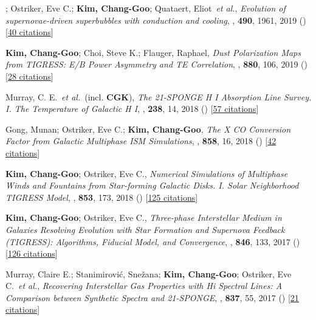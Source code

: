 \item[{18.}]; Ostriker, Eve C.; \textbf{Kim, Chang-Goo}; Quataert, Eliot~\textit{et al.}, \textit{Evolution of supernovae-driven superbubbles with conduction and cooling}, , \textbf{490}, 1961, 2019 () [\href{http://adsabs.harvard.edu/abs/2019MNRAS.490.1961E}{40 citations}]

\item[{17.}]\textbf{Kim, Chang-Goo}; Choi, Steve K.; Flauger, Raphael, \textit{Dust Polarization Maps from TIGRESS: E/B Power Asymmetry and TE Correlation}, , \textbf{880}, 106, 2019 () [\href{http://adsabs.harvard.edu/abs/2019ApJ...880..106K}{28 citations}]

\item[{16.}]Murray, C. E.~\textit{et al.}~(incl. \textbf{CGK}), \textit{The 21-SPONGE H I Absorption Line Survey. I. The Temperature of Galactic H I}, , \textbf{238}, 14, 2018 () [\href{http://adsabs.harvard.edu/abs/2018ApJS..238...14M}{57 citations}]

\item[{15.}]Gong, Munan; Ostriker, Eve C.; \textbf{Kim, Chang-Goo}, \textit{The X CO Conversion Factor from Galactic Multiphase ISM Simulations}, , \textbf{858}, 16, 2018 () [\href{http://adsabs.harvard.edu/abs/2018ApJ...858...16G}{42 citations}]

\item[{14.}]\textbf{Kim, Chang-Goo}; Ostriker, Eve C., \textit{Numerical Simulations of Multiphase Winds and Fountains from Star-forming Galactic Disks. I. Solar Neighborhood TIGRESS Model}, , \textbf{853}, 173, 2018 () [\href{http://adsabs.harvard.edu/abs/2018ApJ...853..173K}{125 citations}]

\item[{13.}]\textbf{Kim, Chang-Goo}; Ostriker, Eve C., \textit{Three-phase Interstellar Medium in Galaxies Resolving Evolution with Star Formation and Supernova Feedback (TIGRESS): Algorithms, Fiducial Model, and Convergence}, , \textbf{846}, 133, 2017 () [\href{http://adsabs.harvard.edu/abs/2017ApJ...846..133K}{126 citations}]

\item[{12.}]Murray, Claire E.; Stanimirovi{\'c}, Sne{\v{z}}ana; \textbf{Kim, Chang-Goo}; Ostriker, Eve C.~\textit{et al.}, \textit{Recovering Interstellar Gas Properties with Hi Spectral Lines: A Comparison between Synthetic Spectra and 21-SPONGE}, , \textbf{837}, 55, 2017 () [\href{http://adsabs.harvard.edu/abs/2017ApJ...837...55M}{21 citations}]

